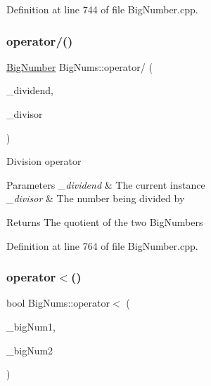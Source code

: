 Definition at line 744 of file Big\+Number.\+cpp.

\mbox{\label{namespace_big_nums_a5f3c743438ecf988d979eceb658f9cf9}} 
\subsubsection{\texorpdfstring{operator/()}{operator/()}}
{\footnotesize\ttfamily \mbox{\hyperlink{class_big_nums_1_1_big_number}{Big\+Number}} Big\+Nums\+::operator/ (\begin{DoxyParamCaption}\item[{\mbox{\hyperlink{class_big_nums_1_1_big_number}{Big\+Number}}}]{\+\_\+dividend,  }\item[{const \mbox{\hyperlink{class_big_nums_1_1_big_number}{Big\+Number}} \&}]{\+\_\+divisor }\end{DoxyParamCaption})}

Division operator 
\begin{DoxyParams}{Parameters}
{\em \+\_\+dividend} & The current instance \\
\hline
{\em \+\_\+divisor} & The number being divided by \\
\hline
\end{DoxyParams}
\begin{DoxyReturn}{Returns}
The quotient of the two Big\+Numbers 
\end{DoxyReturn}


Definition at line 764 of file Big\+Number.\+cpp.

\mbox{\label{namespace_big_nums_a3d130669f3794613ae13100178f0758c}} 
\subsubsection{\texorpdfstring{operator$<$()}{operator<()}}
{\footnotesize\ttfamily bool Big\+Nums\+::operator$<$ (\begin{DoxyParamCaption}\item[{const \mbox{\hyperlink{class_big_nums_1_1_big_number}{Big\+Number}} \&}]{\+\_\+big\+Num1,  }\item[{const \mbox{\hyperlink{class_big_nums_1_1_big_number}{Big\+Number}} \&}]{\+\_\+big\+Num2 }\end{DoxyParamCaption})}


